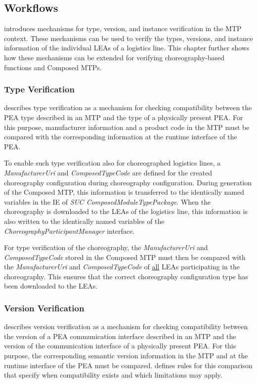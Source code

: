 \subsection{Workflows}
\label{subsec:AnhangManifestWorkflows}

\cite{PNO.2025.Part1} introduces mechanisms for type, version, and instance verification in the MTP context. These mechanisms can be used to verify the types, versions, and instance information of the individual LEAs of a logistics line. This chapter further shows how these mechanisms can be extended for verifying choreography-based functions and Composed MTPs.

\subsubsection{Type Verification}

\cite{PNO.2025.Part1} describes type verification as a mechanism for checking compatibility between the PEA type described in an MTP and the type of a physically present PEA. For this purpose, manufacturer information and a product code in the MTP must be compared with the corresponding information at the runtime interface of the PEA.

To enable such type verification also for choreographed logistics lines, a \emph{ManufacturerUri} and \emph{ComposedTypeCode} are defined for the created choreography configuration during choreography configuration. During generation of the Composed MTP, this information is transferred to the identically named variables in the IE of \emph{SUC ComposedModuleTypePackage}. When the choreography is downloaded to the LEAs of the logistics line, this information is also written to the identically named variables of the \emph{ChoreographyParticipantManager} interface. 

For type verification of the choreography, the \emph{ManufacturerUri} and \emph{ComposedTypeCode} stored in the Composed MTP must then be compared with the \emph{ManufacturerUri} and \emph{ComposedTypeCode} of \underline{all} LEAs participating in the choreography. This ensures that the correct choreography configuration type has been downloaded to the LEAs.

\subsubsection{Version Verification}

\cite{PNO.2025.Part1} describes version verification as a mechanism for checking compatibility between the version of a PEA communication interface described in an MTP and the version of the communication interface of a physically present PEA. For this purpose, the corresponding semantic version information in the MTP and at the runtime interface of the PEA must be compared. \cite{PNO.2025.Part1} defines rules for this comparison that specify when compatibility exists and which limitations may apply.

